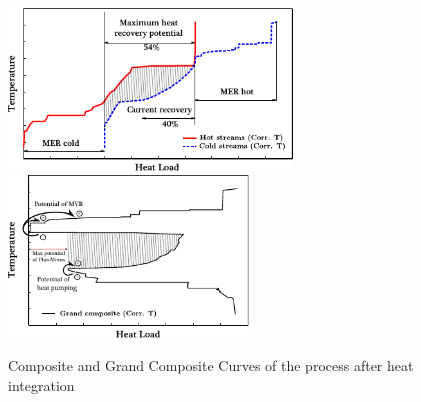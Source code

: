         \begin{figure}[h]
        \begin{center}
        \includegraphics [height=4.3cm]{figures/EnergyIntegration/figMERcc.pdf} 
        \includegraphics [height=4.3cm]{figures/EnergyIntegration/figMERgcc.pdf}
        \caption{Composite and Grand Composite Curves of the process after heat integration}
        \label{fig1:mer}
        \end{center}
        \end{figure}
        

